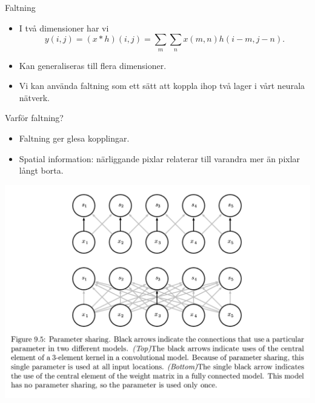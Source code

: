 \documentclass[10pt,english]{beamer}
\begin{document}
\begin{frame}{Faltning}

    \begin{itemize}
        \item I två dimensioner har vi
        \begin{equation*}
            y(i,j) = (x * h)(i,j) = \sum_m \sum_n x(m,n) h(i-m,j-n).
        \end{equation*}
        \item Kan generaliseras till flera dimensioner.
        \item Vi kan använda faltning som ett sätt att koppla ihop två lager i vårt neurala nätverk.
    \end{itemize}
    
\end{frame}

\begin{frame}{Varför faltning?}

    \begin{itemize}
        \item Faltning ger glesa kopplingar.
        \item Spatial information: närliggande pixlar relaterar till varandra mer än pixlar långt borta.
    \end{itemize}

    \includegraphics[width=.9\textwidth]{figs/CNN_sparse_con.png}
    
\end{frame}
\end{document}
